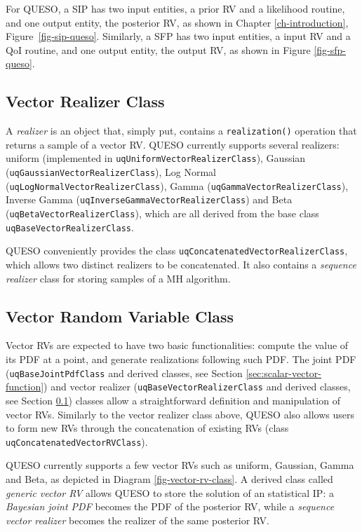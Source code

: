 For QUESO, a SIP has two input entities, a prior RV and
a likelihood routine, and one output entity, the posterior RV, as shown in Chapter \ref{ch-introduction}, Figure~\ref{fig-sip-queso}.
%
Similarly, a SFP has two input entities, a input RV and
a QoI routine, and one output entity, the output RV, as shown in Figure \ref{fig-sfp-queso}.


\subsection{Vector Realizer Class}\label{sec:vector-realizer-class}
%
A {\it realizer} is an object that, simply put, contains a \verb+realization()+ operation that returns a sample of a vector RV.
QUESO currently supports several realizers: uniform (implemented in \verb+uqUniformVectorRealizerClass+), Gaussian (\verb+uqGaussianVectorRealizerClass+), Log Normal (\verb+uqLogNormalVectorRealizerClass+), Gamma (\verb+uqGammaVectorRealizerClass+), Inverse Gamma (\verb+uqInverseGammaVectorRealizerClass+) and Beta (\verb+uqBetaVectorRealizerClass+), which are all derived from the base class \verb+uqBaseVectorRealizerClass+. 

QUESO conveniently provides the class \verb+uqConcatenatedVectorRealizerClass+, which allows two distinct realizers to be concatenated.
It also contains a {\it sequence realizer} class for storing samples of a MH algorithm. 




\subsection{Vector Random Variable Class}
%
Vector RVs are expected to have two basic functionalities:
compute the value of its PDF at a point, and generate realizations following such PDF.
The joint PDF (\verb+uqBaseJointPdfClass+ and derived classes, see Section \ref{sec:scalar-vector-function}) and vector realizer  (\verb+uqBaseVectorRealizerClass+ and derived classes, see Section \ref{sec:vector-realizer-class}) classes allow a straightforward definition and manipulation of vector RVs. Similarly to the vector realizer class above, QUESO also allows users to form new RVs through the concatenation of existing RVs (class \verb+uqConcatenatedVectorRVClass+).

QUESO currently supports a few vector RVs such as uniform, Gaussian, Gamma and Beta, as depicted in Diagram \ref{fig-vector-rv-class}.
A derived class called {\it generic vector RV} allows QUESO to store the solution of an statistical IP:
a {\it Bayesian joint PDF} becomes the PDF of the posterior RV, while a {\it sequence vector realizer} becomes the realizer of the same posterior RV.




